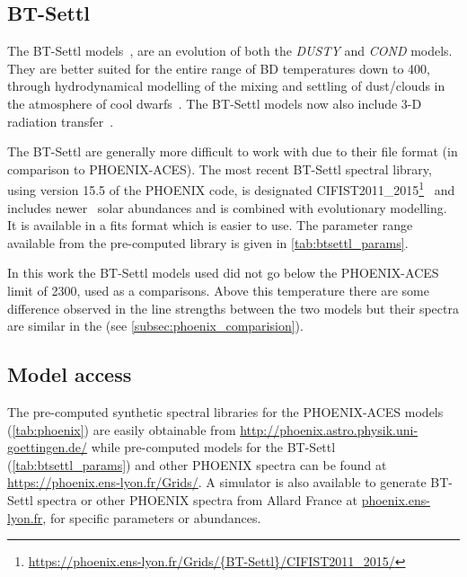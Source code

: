 \subsection{BT-Settl}
\label{subsec:btsettl}
The {BT-Settl} models~\citep{allard_models_2012,allard_atmospheres_2012,rajpurohit_effective_2013,baraffe_new_2015}, are an evolution of both the \emph{DUSTY} and \emph{COND} models.
They are better suited for the entire range of {BD} temperatures down to 400\K{}, through hydrodynamical modelling of the mixing and settling of dust/clouds in the atmosphere of cool dwarfs~\citep{freytag_role_2010}.
The {BT-Settl} models now also include 3-D radiation transfer~\citep{seelmann_3d_2010}.

The {BT-Settl} are generally more difficult to work with due to their file format (in comparison to {PHOENIX-ACES}).
The most recent {BT-Settl} spectral library, using version 15.5 of the {PHOENIX} code, is designated {CIFIST2011\_2015}\footnote{\url{https://phoenix.ens-lyon.fr/Grids/{BT-Settl}/CIFIST2011_2015/}}~\citep{baraffe_new_2015} and includes newer~\citet{caffau_solar_2011} solar abundances and is combined with evolutionary modelling.
It is available in a fits format which is easier to use.
The parameter range available from the pre-computed library is given in \cref{tab:btsettl_params}.



In this work the {BT-Settl} models used did not go below the {PHOENIX-ACES} limit of 2300\K{}, used as a comparisons.
Above this temperature there are some difference observed in the line strengths between the two models but their spectra are similar in the \nir{} (see \cref{subsec:phoenix_comparision}).


\subsection{Model access}
\label{subsec:model_access}
The pre-computed synthetic spectral libraries for the {PHOENIX-ACES} models (\cref{tab:phoenix}) are easily obtainable from \href{http://phoenix.astro.physik.uni-goettingen.de/}{http://phoenix.astro.physik.uni-goettingen.de/} while pre-computed models for the {BT-Settl} (\cref{tab:btsettl_params}) and other {PHOENIX} spectra can be found at \href{https://phoenix.ens-lyon.fr/Grids/}{https://phoenix.ens-lyon.fr/Grids/}.
A simulator is also available to generate {BT-Settl} spectra or other {PHOENIX} spectra from {Allard France} at \href{phoenix.ens-lyon.fr}{phoenix.ens-lyon.fr}, for specific parameters or abundances.

